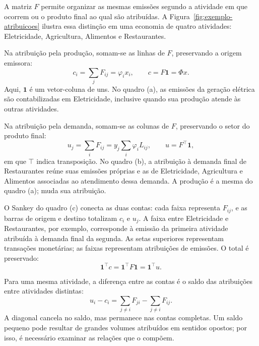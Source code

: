 A matriz $F$ permite organizar as mesmas emissões segundo a atividade em que ocorrem ou o produto final ao qual são atribuídas. A Figura~\ref{fig:exemplo-atribuicoes} ilustra essa distinção em uma economia de quatro atividades: Eletricidade, Agricultura, Alimentos e Restaurantes.

Na atribuição pela produção, somam-se as linhas de $F$, preservando a origem emissora:
\begin{equation}
c_i=\sum_jF_{ij}=\varphi_i x_i,\qquad c=F\mathbf{1}=\Phi x.
\label{eq:conta-producao}
\end{equation}
Aqui, $\mathbf{1}$ é um vetor-coluna de uns. No quadro (a), as emissões da geração elétrica são contabilizadas em Eletricidade, inclusive quando sua produção atende às outras atividades.

Na atribuição pela demanda, somam-se as colunas de $F$, preservando o setor do produto final:
\begin{equation}
u_j=\sum_iF_{ij}=y_j\sum_i\varphi_iL_{ij},\qquad u=F^\top\mathbf{1},
\label{eq:conta-demanda}
\end{equation}
em que $\top$ indica transposição. No quadro (b), a atribuição à demanda final de Restaurantes reúne suas emissões próprias e as de Eletricidade, Agricultura e Alimentos associadas ao atendimento dessa demanda. A produção é a mesma do quadro (a); muda sua atribuição.

O Sankey do quadro (c) conecta as duas contas: cada faixa representa $F_{ij}$, e as barras de origem e destino totalizam $c_i$ e $u_j$. A faixa entre Eletricidade e Restaurantes, por exemplo, corresponde à emissão da primeira atividade atribuída à demanda final da segunda. As setas superiores representam transações monetárias; as faixas representam atribuições de emissões. O total é preservado:
\begin{equation}
\mathbf{1}^\top c=\mathbf{1}^\top F\mathbf{1}=\mathbf{1}^\top u.
\label{eq:conservacao-emissoes}
\end{equation}

Para uma mesma atividade, a diferença entre as contas é o saldo das atribuições entre atividades distintas:
\begin{equation}
u_i-c_i=\sum_{j\ne i}F_{ji}-\sum_{j\ne i}F_{ij}.
\label{eq:saldo-atribuicao}
\end{equation}
A diagonal cancela no saldo, mas permanece nas contas completas. Um saldo pequeno pode resultar de grandes volumes atribuídos em sentidos opostos; por isso, é necessário examinar as relações que o compõem.

